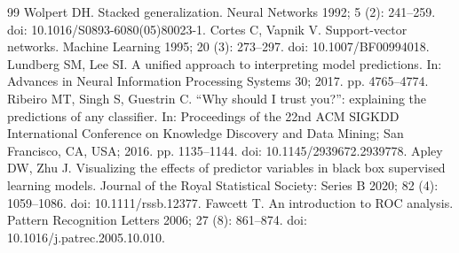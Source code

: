 \documentclass[a4paper,fleqn]{cas-dc}
\begin{document}
\begin{thebibliography}{99}
 Wolpert DH. Stacked generalization. Neural Networks 1992; 5 (2): 241--259. doi: 10.1016/S0893-6080(05)80023-1.
 Cortes C, Vapnik V. Support-vector networks. Machine Learning 1995; 20 (3): 273--297. doi: 10.1007/BF00994018.
 Lundberg SM, Lee SI. A unified approach to interpreting model predictions. In: Advances in Neural Information Processing Systems 30; 2017. pp. 4765--4774.
 Ribeiro MT, Singh S, Guestrin C. ``Why should I trust you?'': explaining the predictions of any classifier. In: Proceedings of the 22nd ACM SIGKDD International Conference on Knowledge Discovery and Data Mining; San Francisco, CA, USA; 2016. pp. 1135--1144. doi: 10.1145/2939672.2939778.
 Apley DW, Zhu J. Visualizing the effects of predictor variables in black box supervised learning models. Journal of the Royal Statistical Society: Series B 2020; 82 (4): 1059--1086. doi: 10.1111/rssb.12377.
 Fawcett T. An introduction to ROC analysis. Pattern Recognition Letters 2006; 27 (8): 861--874. doi: 10.1016/\allowbreak j.patrec.2005.10.010.

\end{thebibliography}
\end{document}
